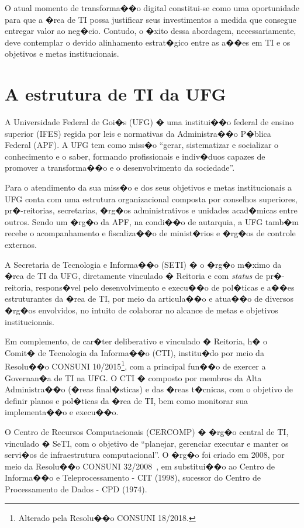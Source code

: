O atual momento de transforma��o digital constitui-se como uma oportunidade para que a �rea de TI possa justificar seus investimentos a medida que consegue entregar valor ao neg�cio. Contudo, o �xito dessa abordagem, necessariamente, deve contemplar o devido alinhamento estrat�gico entre as a��es em TI e os objetivos e metas institucionais. 


\section{A estrutura de TI da UFG}
\label{sec:TIUFG}

A Universidade Federal de Goi�s (UFG) � uma institui��o federal de ensino superior (IFES) regida por leis e normativas da Administra��o P�blica Federal (APF). A UFG tem como miss�o ``gerar, sistematizar e socializar o conhecimento e o saber, formando profissionais e indiv�duos capazes de promover a transforma��o e o desenvolvimento da sociedade''.

Para o atendimento da sua miss�o e dos seus objetivos e metas institucionais a UFG conta com uma estrutura organizacional composta por conselhos superiores, pr�-reitorias, secretarias, �rg�os administrativos e unidades acad�micas entre outros. Sendo um �rg�o da APF, na condi��o de autarquia, a UFG tamb�m recebe o acompanhamento e fiscaliza��o de minist�rios e �rg�os de controle externos.  

A Secretaria de Tecnologia e Informa��o (SETI) � o �rg�o m�ximo da �rea de TI da UFG, diretamente vinculado � Reitoria e com \textit{status} de pr�-reitoria, respons�vel pelo desenvolvimento e execu��o de pol�ticas e a��es estruturantes da �rea de TI, por meio da articula��o e atua��o de diversos �rg�os envolvidos, no intuito de colaborar no alcance de metas e objetivos institucionais.

Em complemento, de car�ter deliberativo e vinculado � Reitoria, h� o Comit� de Tecnologia da Informa��o (CTI), institu�do por meio da Resolu��o CONSUNI 10/2015\footnote{Alterado pela Resolu��o CONSUNI 18/2018.}, com a principal fun��o de exercer a Governan�a de TI na UFG. O CTI � composto por membros da Alta Administra��o (�reas final�sticas) e das �reas t�cnicas, com o objetivo de definir planos e pol�ticas da �rea de TI, bem como monitorar sua implementa��o e execu��o.

O Centro de Recursos Computacionais (CERCOMP) � �rg�o central de TI, vinculado � SeTI, com o objetivo de ``planejar, gerenciar executar e manter os servi�os de infraestrutura computacional''. O �rg�o foi criado em 2008, por meio da Resolu��o CONSUNI 32/2008~\cite{Cercomp2018}, em substitui��o ao Centro de Informa��o e Teleprocessamento - CIT (1998), sucessor do Centro de Processamento de Dados - CPD (1974).

